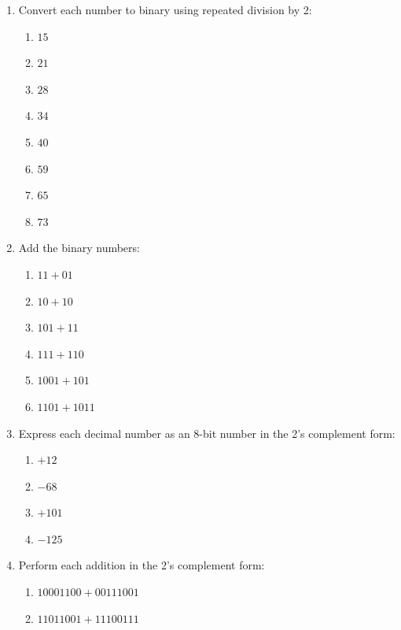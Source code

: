 \documentclass[11pt]{article}
\begin{document}
\begin{enumerate}
\item Convert each number to binary using repeated division by 2:

\begin{enumerate}[label=(\alph*)]
    \item $15$
    \item $21$
    \item $28$
    \item $34$
    \item $40$
    \item $59$
    \item $65$
    \item $73$
\end{enumerate}



\item Add the binary numbers:

\begin{enumerate}[label=(\alph*)]
    \item $11 + 01$
    \item $10 + 10$
    \item $101 + 11$
    \item $111 + 110$
    \item $1001 + 101$
    \item $1101 + 1011$
\end{enumerate}



\item Express each decimal number as an 8-bit number in the 2's complement form:

\begin{enumerate}[label=(\alph*)]
    \item $+12$
    \item $-68$
    \item $+101$
    \item $-125$
\end{enumerate}



\item Perform each addition in the 2's complement form:

\begin{enumerate}[label=(\alph*)]
    \item $10001100 + 00111001$
    \item $11011001 + 11100111$
\end{enumerate}

\end{enumerate}
\end{document}
